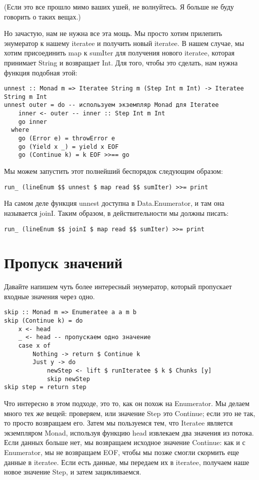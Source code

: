 (Если это все прошло мимо ваших ушей, не волнуйтесь. Я больше не буду говорить о таких вещах.)

Но зачастую, нам не нужна все эта мощь. Мы просто хотим прилепить энумератор к нашему iteratee и получить новый iteratee. В нашем случае, мы хотим присоединить map к sumIter для получения нового iteratee, которая принимает String и возвращает Int. Для того, чтобы это сделать, нам нужна функция подобная этой:

\begin{lstlisting}
unnest :: Monad m => Iteratee String m (Step Int m Int) -> Iteratee String m Int
unnest outer = do -- используем экземпляр Monad для Iteratee
    inner <- outer -- inner :: Step Int m Int
    go inner
  where
    go (Error e) = throwError e
    go (Yield x _) = yield x EOF
    go (Continue k) = k EOF >>== go
\end{lstlisting}

Мы можем запустить этот полнейший беспорядок следующим образом:

\begin{lstlisting}
run_ (lineEnum $$ unnest $ map read $$ sumIter) >>= print
\end{lstlisting}%

На самом деле функция unnest доступна в Data.Enumerator, и там она называется joinI. Таким образом, в действительности мы должны писать:

\begin{lstlisting}
run_ (lineEnum $$ joinI $ map read $$ sumIter) >>= print
\end{lstlisting}%

\section{Пропуск значений}

Давайте напишем чуть более интересный энумератор, который пропускает входные значения через одно.

\begin{lstlisting}
skip :: Monad m => Enumeratee a a m b
skip (Continue k) = do
    x <- head
    _ <- head -- пропускаем одно значение
    case x of
        Nothing -> return $ Continue k
        Just y -> do
            newStep <- lift $ runIteratee $ k $ Chunks [y]
            skip newStep
skip step = return step
\end{lstlisting}%

Что интересно в этом подходе, это то, как он похож на Enumerator. Мы делаем много тех же вещей: проверяем, или значение Step это Continue; если это не так, то просто возвращаем его. Затем мы пользуемся тем, что Iteratee является экземпляром Monad, используя функцию head извлекаем два значения из потока. Если данных больше нет, мы возвращаем исходное значение Continue: как и с Enumerator, мы не возвращаем EOF, чтобы мы позже смогли скормить еще данные в iteratee. Если есть данные, мы передаем их в iteratee, получаем наше новое значение Step, и затем зацикливаемся.

